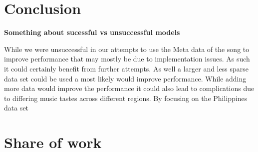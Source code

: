 \documentclass[11pt]{article}
\begin{document}
% 
% 
\section{Conclusion}
\textbf{Something about sucessful vs unsuccessful models}


While we were unsuccessful in our attempts to use the Meta data of the song to improve performance that may mostly be due to implementation issues. As such it could certainly benefit from further attempts. As well a larger and less sparse data set could be used a most likely would improve performance.
While adding more data would improve the performance it could also lead to complications due to differing music tastes across different regions. By focusing on the Philippines data set  


% 
\section{Share of work}
% 
% 



\end{document}

